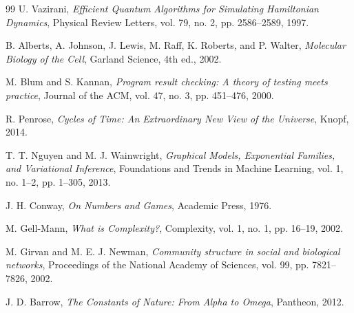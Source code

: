 \documentclass[12pt]{article}
\begin{document}
\begin{thebibliography}{99}
U. Vazirani, \emph{Efficient Quantum Algorithms for Simulating Hamiltonian Dynamics}, Physical Review Letters, vol. 79, no. 2, pp. 2586–2589, 1997.

B. Alberts, A. Johnson, J. Lewis, M. Raff, K. Roberts, and P. Walter, \emph{Molecular Biology of the Cell}, Garland Science, 4th ed., 2002.

M. Blum and S. Kannan, \emph{Program result checking: A theory of testing meets practice}, Journal of the ACM, vol. 47, no. 3, pp. 451–476, 2000.

R. Penrose, \emph{Cycles of Time: An Extraordinary New View of the Universe}, Knopf, 2014.

T. T. Nguyen and M. J. Wainwright, \emph{Graphical Models, Exponential Families, and Variational Inference}, Foundations and Trends in Machine Learning, vol. 1, no. 1–2, pp. 1–305, 2013.

J. H. Conway, \emph{On Numbers and Games}, Academic Press, 1976.

M. Gell-Mann, \emph{What is Complexity?}, Complexity, vol. 1, no. 1, pp. 16–19, 2002.

M. Girvan and M. E. J. Newman, \emph{Community structure in social and biological networks}, Proceedings of the National Academy of Sciences, vol. 99, pp. 7821–7826, 2002.

J. D. Barrow, \emph{The Constants of Nature: From Alpha to Omega}, Pantheon, 2012.

\end{thebibliography}
\end{document}
